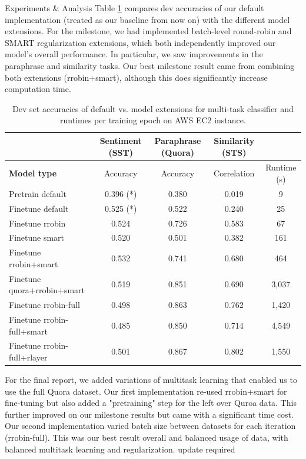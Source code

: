\documentclass[final]{beamer}
\newlength{\colwidth}
\begin{document}
\begin{frame}[t]
\begin{columns}[t]
\begin{column}{\colwidth}
\begin{block}{Experiments \& Analysis}
Table \ref{tab: multi} compares dev accuracies of our default implementation (treated as our baseline from now on) with the different model extensions. For the milestone, we had implemented batch-level round-robin and SMART regularization extensions, which both independently improved our model's overall performance. In particular, we saw improvements in the paraphrase and similarity tasks. Our best milestone result came from combining both extensions (rrobin+smart), although this does significantly increase computation time.

\begin{table}[h]
\footnotesize
\centering
\begin{tabular}{|l|cccc|} \hline
& \multicolumn{1}{c}{\textbf{Sentiment (SST)}} & \multicolumn{1}{c}{\textbf{Paraphrase (Quora)}} & \multicolumn{1}{c}{\textbf{Similarity (STS)}} &  \\ \hline
\textbf{Model type} & Accuracy & Accuracy & Correlation & Runtime (s) \\ \hline
Pretrain default      & 0.396 (*)         & 0.380            & 0.019 & 9          \\
Finetune default      & 0.525 (*)        & 0.522           & 0.240 &  25         \\ \hdashline
Finetune rrobin       & 0.524            & 0.726            & 0.583   & 67        \\
Finetune smart        & 0.520             & 0.501           & 0.382 & 161          \\
Finetune rrobin+smart & 0.532              & 0.741            & 0.680 & 464          \\ \hdashline
Finetune quora+rrobin+smart & 0.519          & 0.851           & 0.690 & 3,037         \\
Finetune rrobin-full & 0.498          & 0.863           & 0.762 & 1,420         \\ 
Finetune rrobin-full+smart & 0.485          & 0.850           & 0.714 & 4,549         \\
Finetune rrobin-full+rlayer & 0.501     & 0.867         & 0.802    & 1,550                 \\ \hline
\end{tabular}
\caption{Dev set accuracies of default vs. model extensions for multi-task classifier and runtimes per training epoch on AWS EC2 instance.}
\label{tab: multi}
\end{table}
For the final report, we added variations of multitask learning that enabled us to use the full Quora dataset. Our first implementation re-used rrobin+smart for fine-tuning but also added a "pretraining" step for the left over Quroa data. This further improved on our milestone results but came with a significant time cost. Our second implementation varied batch size between datasets for each iteration (rrobin-full). This was our best result overall and balanced usage of data, with balanced multitask learning and regularization. {\color{red}update required}


\end{block}
\end{column}
\end{columns}
\end{frame}
\end{document}
